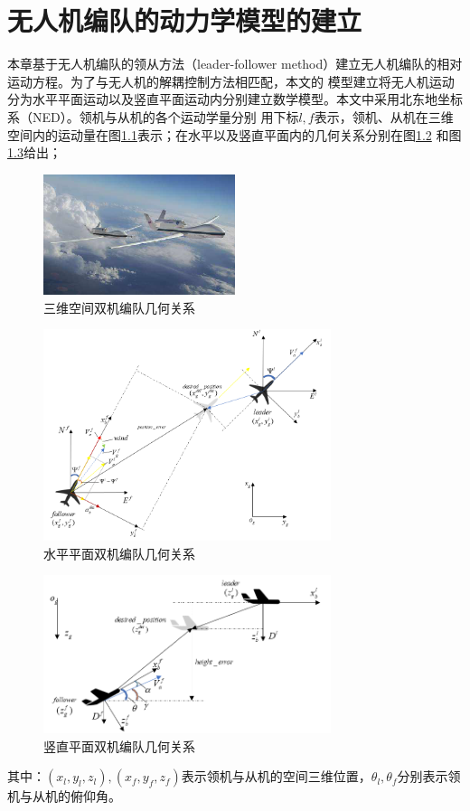 \chapter{无人机编队的动力学模型的建立}
\label{chap:formation_dynamic_equ}
本章基于无人机编队的领从方法（leader-follower method）建立无人机编队的相对运动方程。为了与无人机的解耦控制方法相匹配，本文的
模型建立将无人机运动分为水平平面运动以及竖直平面运动内分别建立数学模型。本文中采用北东地坐标系（NED）。领机与从机的各个运动学量分别
用下标$l,f$表示，领机、从机在三维空间内的运动量在图\ref{fig:c02-3d_rel_motion}表示；在水平以及竖直平面内的几何关系分别在图\ref{fig:c02-2d_level_motion}
和图\ref{fig:c02-2d_vert_motion}给出；
\begin{figure}[H]
    \centering
    \includegraphics[width=0.5\textwidth]{figures/c1/c01-meaning-1}
    \caption{三维空间双机编队几何关系}\label{fig:c02-3d_rel_motion}
\end{figure}
\begin{figure}[H]
    \centering
    \includegraphics[width=0.75\textwidth]{figures/c2/2d_level_motion}
    \caption{水平平面双机编队几何关系}\label{fig:c02-2d_level_motion}
\end{figure}
\begin{figure}[H]
    \centering
    \includegraphics[width=0.75\textwidth]{figures/c2/2d_vert_motion}
    \caption{竖直平面双机编队几何关系}\label{fig:c02-2d_vert_motion}
\end{figure}
其中：$(x_l,y_l,z_l),(x_f,y_f,z_f)$表示领机与从机的空间三维位置，$\theta_l,\theta_f$分别表示领机与从机的俯仰角。